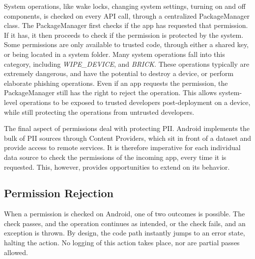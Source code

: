 System operations, like wake locks, changing system settings, turning on and off components, is checked on every API call, through a centralized PackageManager class. The PackageManager first checks if the app has requested that permission. If it has, it then proceeds to check if the permission is protected by the system. Some permissions are only available to trusted code, through either a shared key, or being located in a system folder. Many system operations fall into this category, including \textit{WIPE\_DEVICE}, and \textit{BRICK}. These operations typically are extremely dangerous, and have the potential to destroy a device, or perform elaborate phishing operations. Even if an app requests the permission, the PackageManager still has the right to reject the operation. This allows system-level operations to be exposed to trusted developers post-deployment on a device, while still protecting the operations from untrusted developers.

The final aspect of permissions deal with protecting PII. Android implements the bulk of PII sources through Content Providers, which sit in front of a dataset and provide access to remote services. It is therefore imperative for each individual data source to check the permissions of the incoming app, every time it is requested. This, however, provides opportunities to extend on its behavior.

\subsection{Permission Rejection}
\label{sec:permissionrejection}
When a permission is checked on Android, one of two outcomes is possible. The check passes, and the operation continues as intended, or the check fails, and an exception is thrown. By design, the code path instantly jumps to an error state, halting the action. No logging of this action takes place, nor are partial passes allowed.

